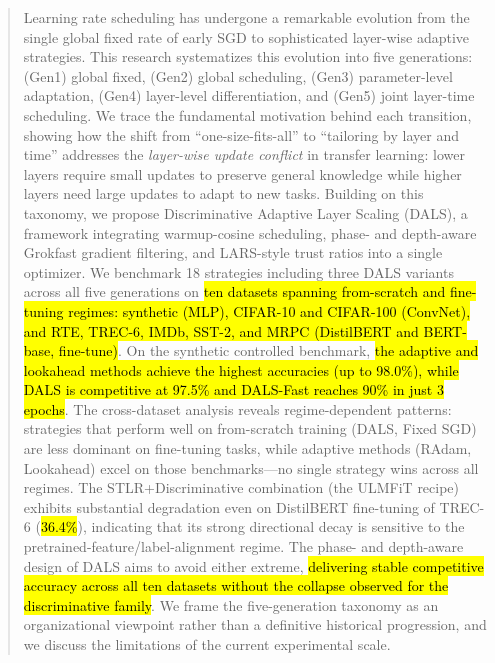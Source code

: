 \documentclass[a4paper,fleqn]{cas-dc}
\begin{document}
\begin{abstract}
Learning rate scheduling has undergone a remarkable evolution from the single global fixed rate of early SGD to sophisticated layer-wise adaptive strategies. This research systematizes this evolution into five generations: (Gen1) global fixed, (Gen2) global scheduling, (Gen3) parameter-level adaptation, (Gen4) layer-level differentiation, and (Gen5) joint layer-time scheduling. We trace the fundamental motivation behind each transition, showing how the shift from ``one-size-fits-all'' to ``tailoring by layer and time'' addresses the \emph{layer-wise update conflict} in transfer learning: lower layers require small updates to preserve general knowledge while higher layers need large updates to adapt to new tasks. Building on this taxonomy, we propose Discriminative Adaptive Layer Scaling (DALS), a framework integrating warmup-cosine scheduling, phase- and depth-aware Grokfast gradient filtering, and LARS-style trust ratios into a single optimizer. We benchmark 18 strategies including three DALS variants across all five generations on \hl{ten datasets spanning from-scratch and fine-tuning regimes: synthetic (MLP), CIFAR-10 and CIFAR-100 (ConvNet), and RTE, TREC-6, IMDb, SST-2, and MRPC (DistilBERT and BERT-base, fine-tune)}. On the synthetic controlled benchmark, \hl{the adaptive and lookahead methods achieve the highest accuracies (up to 98.0\%), while DALS is competitive at 97.5\% and DALS-Fast reaches 90\% in just 3 epochs}. The cross-dataset analysis reveals regime-dependent patterns: strategies that perform well on from-scratch training (DALS, Fixed SGD) are less dominant on fine-tuning tasks, while adaptive methods (RAdam, Lookahead) excel on those benchmarks---no single strategy wins across all regimes. The STLR+Discriminative combination (the ULMFiT recipe) exhibits substantial degradation even on DistilBERT fine-tuning of TREC-6 (\hl{36.4\%}), indicating that its strong directional decay is sensitive to the pretrained-feature/label-alignment regime. The phase- and depth-aware design of DALS aims to avoid either extreme, \hl{delivering stable competitive accuracy across all ten datasets without the collapse observed for the discriminative family}. We frame the five-generation taxonomy as an organizational viewpoint rather than a definitive historical progression, and we discuss the limitations of the current experimental scale.
\end{abstract}
\end{document}
